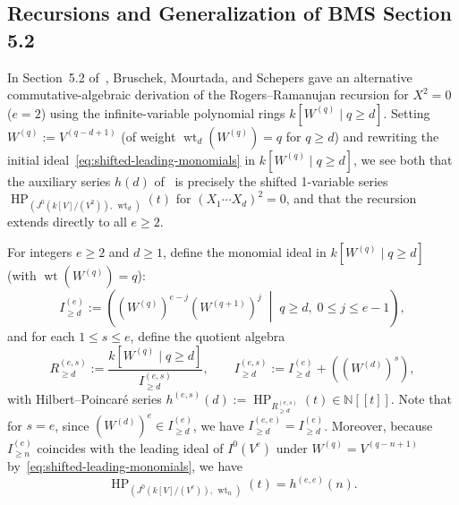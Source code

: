 \documentclass[a4paper, 12pt]{amsart}
\theoremstyle{remark}
\begin{document}
\subsection{Recursions and Generalization of BMS Section 5.2}
\label{subsec:finite-variable-recursions}

In Section~5.2 of~\cite{bruschek_arc_2013},
Bruschek, Mourtada, and Schepers gave an alternative commutative-algebraic derivation of the Rogers--Ramanujan recursion for $X^2 = 0$ ($e = 2$) using the infinite-variable polynomial rings $k[W^{(q)} \mid q \ge d]$.
Setting $W^{(q)} := V^{(q - d + 1)}$ (of weight $\operatorname{wt}_d(W^{(q)}) = q$ for $q \ge d$) and rewriting the initial ideal~\eqref{eq:shifted-leading-monomials} in $k[W^{(q)} \mid q \ge d]$,
we see both that the auxiliary series $h(d)$ of~\cite{bruschek_arc_2013} is precisely the shifted 1-variable series $\operatorname{HP}_{\left(J^0(k[V]/(V^2)), \, \operatorname{wt}_d\right)}(t)$ for $(X_1 \cdots X_d)^2 = 0$,
and that the recursion extends directly to all $e \ge 2$.

For integers $e \ge 2$ and $d \ge 1$,
define the monomial ideal in $k[W^{(q)} \mid q \ge d]$ (with $\operatorname{wt}(W^{(q)}) = q$):
\begin{equation}
  I_{\ge d}^{(e)} := \left( (W^{(q)})^{e - j} (W^{(q + 1)})^j \;\middle|\; q \ge d, \; 0 \le j \le e - 1 \right),
\end{equation}
and for each $1 \le s \le e$,
define the quotient algebra
\begin{equation}
  R_{\ge d}^{(e, s)} := \frac{k[W^{(q)} \mid q \ge d]}{I_{\ge d}^{(e, s)}}, \qquad
  I_{\ge d}^{(e, s)} := I_{\ge d}^{(e)} + \left((W^{(d)})^s\right),
\end{equation}
with Hilbert--Poincaré series $h^{(e, s)}(d) := \operatorname{HP}_{R_{\ge d}^{(e, s)}}(t) \in \mathbb{N}[[t]]$.
Note that for $s = e$,
since $(W^{(d)})^e \in I_{\ge d}^{(e)}$,
we have $I_{\ge d}^{(e, e)} = I_{\ge d}^{(e)}$.
Moreover,
because $I_{\ge n}^{(e)}$ coincides with the leading ideal of $I^0(V^e)$ under $W^{(q)} = V^{(q - n + 1)}$ by~\eqref{eq:shifted-leading-monomials},
we have
\begin{equation}
  \operatorname{HP}_{\left(J^0(k[V]/(V^e)), \, \operatorname{wt}_n\right)}(t) = h^{(e, e)}(n).
\end{equation}
\end{document}
